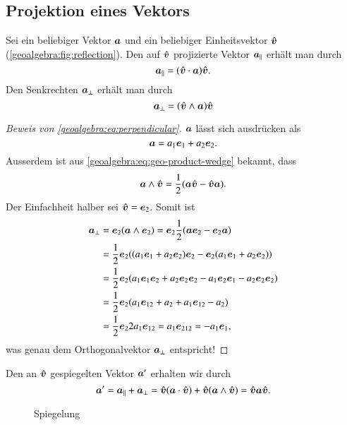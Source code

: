 \subsection{Projektion eines Vektors}
Sei ein beliebiger Vektor $\a$ und ein beliebiger Einheitsvektor $\v$ (\autoref{geoalgebra:fig:reflection}).
Den auf $\v$ projizierte Vektor $\a_{||}$ erhält man durch
\begin{equation*}
  \a_{||} = (\v \cdot \a) \v.
\end{equation*}
Den Senkrechten $\a_{\perp}$ erhält man durch
\begin{equation}
  \a_{\perp} = (\v \wedge \a) \v
  \label{geoalgebra:eq:perpendicular}
\end{equation}
\begin{proof}[Beweis von \eqref{geoalgebra:eq:perpendicular}]
  $\a$ lässt sich ausdrücken als
  \begin{equation*}
    \a = a_1 \eone + a_2 \etwo.
  \end{equation*}
  Ausserdem ist aus \eqref{geoalgebra:eq:geo-product-wedge} bekannt, dass
  \begin{equation*}
    \a \wedge \v = \frac{1}{2} (\a \v - \v \a).
  \end{equation*}
Der Einfachheit halber sei $\v = \etwo$.
  Somit ist
  \begin{align*}
      \a_{\perp} &= \etwo (\a \wedge \etwo) = \etwo \frac{1}{2} (\a \etwo - \etwo \a) \\
                 &= \frac{1}{2} \etwo ((a_1 \eone + a_2 \etwo) \etwo - \etwo (a_1 \eone + a_2 \etwo)) \\
                 &= \frac{1}{2} \etwo (a_1 \eone \etwo + a_2 \etwo \etwo - a_1 \etwo \eone - a_2 \etwo \etwo) \\
                 &= \frac{1}{2} \etwo (a_1 \eot + a_2 + a_1 \eot - a_2) \\
                 &= \frac{1}{2} \etwo 2 a_1 \eot = a_1 \boldsymbol{e}_{212} = -a_1 \eone,
  \end{align*}
  was genau dem Orthogonalvektor $\a_{\perp}$ entspricht!
\end{proof}
Den an $\v$ gespiegelten Vektor $\a'$ erhalten wir durch
\begin{equation*}
  \a' = \a_{||} + \a_{\perp} = \v (\a \cdot \v) + \v (\a \wedge \v) = \v \a \v.
\end{equation*}
\begin{figure}
  \begin{center}
  
  \end{center}
\caption{Spiegelung}
\label{geoalgebra:fig:reflection}
\end{figure}
